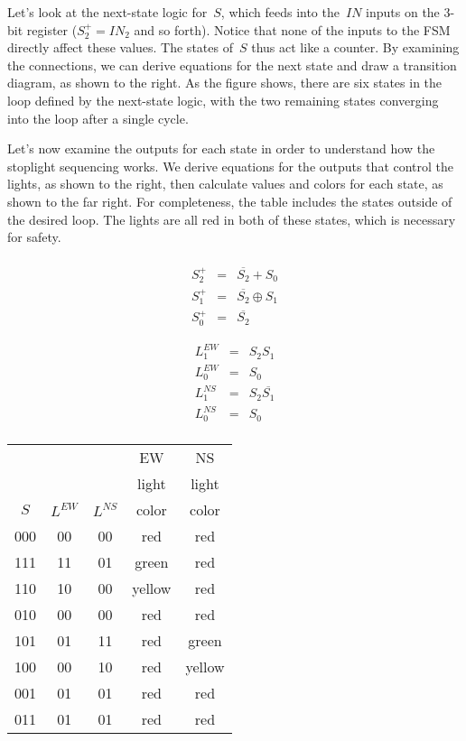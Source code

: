 \begin{minipage}{2.55in}
Let's look at the next-state logic for~$S$, which feeds into the~$IN$
inputs on the \mbox{3-bit} register ($S_2^+=IN_2$ and so forth).  Notice 
that none of the inputs to the FSM directly affect these values.  The
states of~$S$ thus act like a counter.  By examining the connections,
we can derive equations for the next state and draw a transition
diagram, as shown to the right.
%
As the figure shows, there are six states in the loop defined by the 
next-state logic, with the two remaining states converging into the
loop after a single cycle.\mpline

Let's now examine the outputs for each
state in order to understand how the stoplight sequencing
works.
%
We derive equations for the outputs that control the lights, as shown
to the right, then calculate values and colors for each
state, as shown to the far right.  For completeness, the table 
includes the states outside of the desired loop.  The 
lights are all red in both of these states, which is necessary for safety.
\end{minipage}\hspace{0.25in}%
\begin{minipage}{1.05in}
\begin{eqnarray*}
\\
S_2^+ &=& \overline{S_2} + S_0\\
S_1^+ &=& \overline{S_2} \oplus S_1\\
S_0^+ &=& \overline{S_2}
\end{eqnarray*}\vspace{60pt}

\begin{eqnarray*}
L_1^{EW} &=& S_2 S_1\\
L_0^{EW} &=& S_0\\
L_1^{NS} &=& S_2 \overline{S_1}\\
L_0^{NS} &=& S_0\\
\end{eqnarray*}
\end{minipage}\hspace{0.25in}%
\begin{minipage}{2.4in}
\centerline{}\vspace{24pt}
\begin{tabular}{c|cc|cc}
&&& EW& NS\\
&&& light& light\\
$S$& $L^{EW}$& $L^{NS}$& color& color\\ \hline
000& 00& 00&    red&    red\\
111& 11& 01&  green&    red\\
110& 10& 00& yellow&    red\\
010& 00& 00&    red&    red\\
101& 01& 11&    red&  green\\
100& 00& 10&    red& yellow\\ \hline
001& 01& 01&    red&    red\\
011& 01& 01&    red&    red\\
\end{tabular}\vspace{12pt}
\end{minipage}


